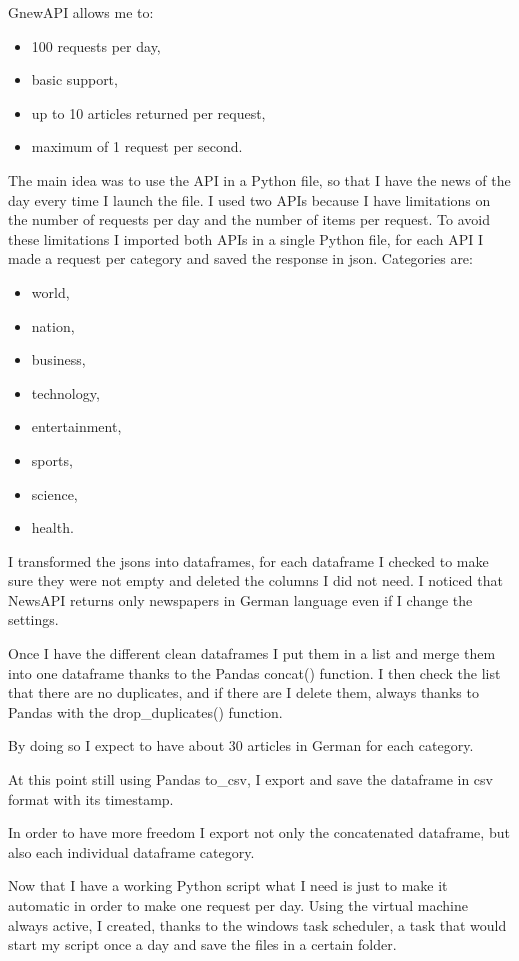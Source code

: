 GnewAPI allows me to:
\begin{itemize}
    \item 100 requests per day,
    \item basic support,
    \item up to 10 articles returned per request,
    \item maximum of 1 request per second.
\end{itemize}
The main idea was to use the API in a Python file, so that I have the news of the day every time I launch the file.
I used two APIs because I have limitations on the number of requests per day and the number of items per request.
To avoid these limitations I imported both APIs in a single Python file, for each API I made a request per category and saved the response in json.
Categories are:
\begin{itemize}
    \item world,
    \item nation,
    \item business,
    \item technology,
    \item entertainment,
    \item sports,
    \item science,
    \item health.
\end{itemize}

I transformed the jsons into dataframes, for each dataframe I checked to make sure they were not empty and deleted the columns I did not need.
I noticed that NewsAPI returns only newspapers in German language even if I change the settings.

Once I have the different clean dataframes I put them in a list and merge them into one dataframe thanks to the \gls{Pandas} concat() function.
I then check the list that there are no duplicates, and if there are I delete them, always thanks to \gls{Pandas} with the drop\_duplicates() function.

By doing so I expect to have about 30 articles in German for each category.

At this point still using \gls{Pandas} to\_csv, I export and save the dataframe in csv format with its timestamp.

In order to have more freedom I export not only the concatenated dataframe, but also each individual dataframe category.

Now that I have a working Python script what I need is just to make it automatic in order to make one request per day.
Using the virtual machine always active, I created, thanks to the windows task scheduler, a task that would start my script once a day and save the files in a certain folder.

